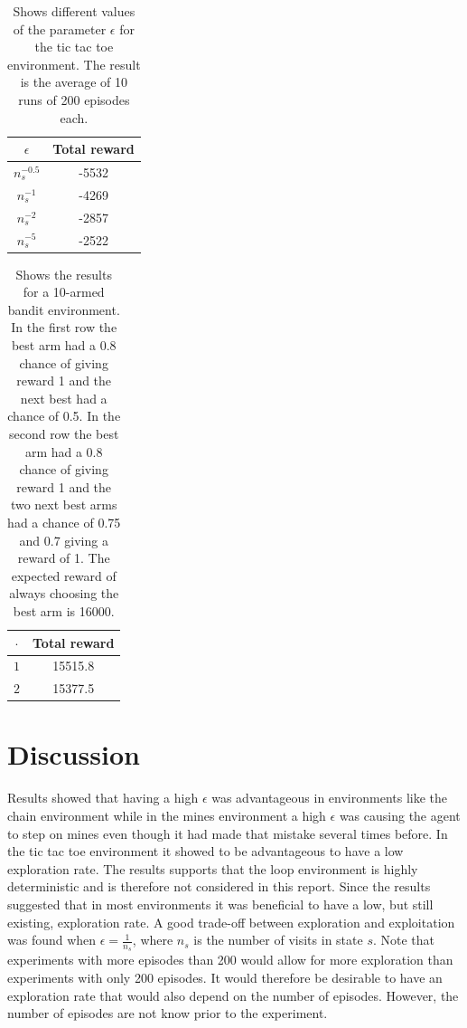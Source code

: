 \documentclass[11pt]{article}
\numberwithin{equation}{section}
\begin{document}
\begin{flushleft}
\begin{table}[H]
\caption{Shows different values of the parameter $\epsilon$ for the tic tac toe environment. The result is the average of 10 runs of 200 episodes each.}
\begin{center}
\begin{tabular}{|c|c|}
\hline
$\epsilon$ & Total reward \\ \hline
$n_s^{-0.5}$ & -5532 \\ \hline
$n_s^{-1}$ & -4269 \\ \hline
$n_s^{-2}$ & -2857 \\ \hline
$n_s^{-5}$ & -2522 \\
\hline
\end{tabular}
\label{tab:tttMean}
\end{center}
\end{table}

\begin{table}[H]
\caption{Shows the results for a 10-armed bandit environment. In the first row the best arm had a 0.8 chance of giving reward 1 and the next best had a chance of 0.5. In the second row the best arm had a 0.8 chance of giving reward 1 and the two next best arms had a chance of 0.75 and 0.7 giving a reward of 1. The expected reward of always choosing the best arm is 16000.}
\begin{center}
\begin{tabular}{|c|c|}
\hline
$\cdot$ & Total reward \\ \hline
$1$ & 15515.8 \\ \hline
$2$ & 15377.5 \\
\hline
\end{tabular}
\label{tab:UCBMean}
\end{center}
\end{table}

\section{Discussion}

Results showed that having a high $\epsilon$ was advantageous in environments like the chain environment while in the mines environment a high $\epsilon$ was causing the agent to step on mines even though it had made that mistake several times before. In the tic tac toe environment it showed to be advantageous to have a low exploration rate. The results supports that the loop environment is highly deterministic and is therefore not considered in this report. Since the results suggested that in most environments it was beneficial to have a low, but still existing, exploration rate. A good trade-off between exploration and exploitation was found when $\epsilon = \frac{1}{n_s}$, where $n_s$ is the number of visits in state $s$. Note that experiments with more episodes than 200 would allow for more exploration than experiments with only 200 episodes. It would therefore be desirable to have an exploration rate that would also depend on the number of episodes. However, the number of episodes are not know prior to the experiment. \newline


\end{flushleft}
\end{document}
